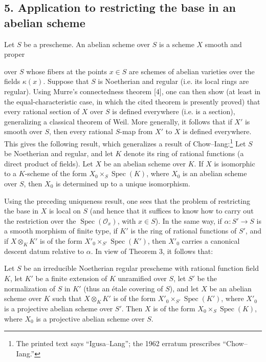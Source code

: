 \subsection*{5. Application to restricting the base in an abelian scheme}

Let $S$ be a prescheme. An abelian scheme over $S$ is a scheme $X$ smooth and
proper

over $S$ whose fibers at the points $x\in S$ are schemes of abelian varieties
over the fields $\kappa(x)$. Suppose that $S$ is Noetherian and regular (i.e.
its local rings are regular). Using Murre's connectedness theorem [4], one can
then show (at least in the equal-characteristic case, in which the cited
theorem is presently proved) that every rational section of $X$ over $S$ is
defined everywhere (i.e. is a section), generalizing a classical theorem of
Weil. More generally, it follows that if $X'$ is smooth over $S$, then every
rational $S$-map from $X'$ to $X$ is defined everywhere. This gives the
following result, which generalizes a result of Chow--Iang:\footnote{The
printed text says “Igusa--Lang”; the 1962 erratum prescribes “Chow--Iang.”}
Let $S$ be Noetherian and regular, and let $K$ denote its ring of rational
functions (a direct product of fields). Let $X$ be an abelian scheme over $K$.
If $X$ is isomorphic to a $K$-scheme of the form
$X_0\times_S\operatorname{Spec}(K)$, where $X_0$ is an abelian scheme over
$S$, then $X_0$ is determined up to a unique isomorphism.

Using the preceding uniqueness result, one sees that the problem of
restricting the base in $X$ is local on $S$ (and hence that it suffices to know
how to carry out the restriction over the $\operatorname{Spec}(\mathcal O_x)$,
with $x\in S$). In the same way, if $\alpha:S'\longrightarrow S$ is a smooth
morphism of finite type, if $K'$ is the ring of rational functions of $S'$,
and if $X\otimes_KK'$ is of the form
$X'_0\times_{S'}\operatorname{Spec}(K')$, then $X'_0$ carries a canonical
descent datum relative to $\alpha$. In view of Theorem 3, it follows that:

 Let $S$ be an irreducible Noetherian regular
prescheme with rational function field $K$, let $K'$ be a finite extension of
$K$ unramified over $S$, let $S'$ be the normalization of $S$ in $K'$ (thus an
étale covering of $S$), and let $X$ be an abelian scheme over $K$ such that
$X\otimes_KK'$ is of the form
$X'_0\times_{S'}\operatorname{Spec}(K')$, where $X'_0$ is a projective abelian
scheme over $S'$. Then $X$ is of the form
$X_0\times_S\operatorname{Spec}(K)$, where $X_0$ is a projective abelian scheme
over $S$.

